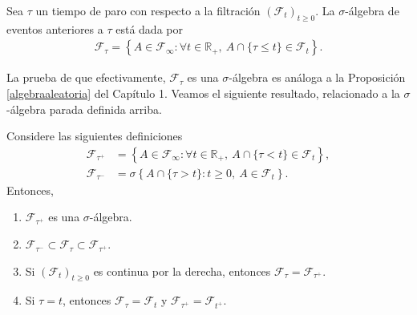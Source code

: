 \begin{definition}
	Sea $\tau$ un tiempo de paro con respecto a la filtración $(\mathcal{F}_t)_{t \geq 0}$. La $\sigma$-álgebra de eventos anteriores a $\tau$ está dada por 
	\begin{align*}
	\mathcal{F}_{\tau} = \left\{ A \in \mathcal{F}_{\infty} : \forall t \in \mathbb{R}_{+}, \ A \cap \{\tau \leq t\} \in \mathcal{F}_t \right\}.
	\end{align*}
\end{definition}
La prueba de que efectivamente, $\mathcal{F}_{\tau}$ es una $\sigma$-álgebra es análoga a la Proposición \ref{algebraaleatoria} del Capítulo 1. Veamos el siguiente resultado, relacionado a la $\sigma$-álgebra parada definida arriba.
\begin{proposition}
	Considere las siguientes definiciones
	\begin{align*}
		\mathcal{F}_{\tau^{+}} & = \left\{ A \in \mathcal{F}_{\infty} : \forall t \in \mathbb{R}_{+}, \ A \cap \{\tau < t\} \in \mathcal{F}_t \right\}, \\
		\mathcal{F}_{\tau^{-}} & = \sigma \left\{ A \cap \{\tau > t\} : t \geq 0, \ A \in \mathcal{F}_t \right\}.
	\end{align*}
	Entonces, 
	\begin{enumerate}
		\item $\mathcal{F}_{\tau^{+}}$ es una $\sigma$-álgebra.
		\item $\mathcal{F}_{\tau^{-}} \subset \mathcal{F}_{\tau} \subset \mathcal{F}_{\tau^{+}}$.
		\item Si $(\mathcal{F}_t)_{t \geq 0}$ es continua por la derecha, entonces $\mathcal{F}_{\tau} = \mathcal{F}_{\tau^{+}}$.
		\item Si $\tau = t$, entonces $\mathcal{F}_{\tau} = \mathcal{F}_t$ y $\mathcal{F}_{\tau^{+}} = \mathcal{F}_{t^{+}}$.
	\end{enumerate}
	\end{proposition}
